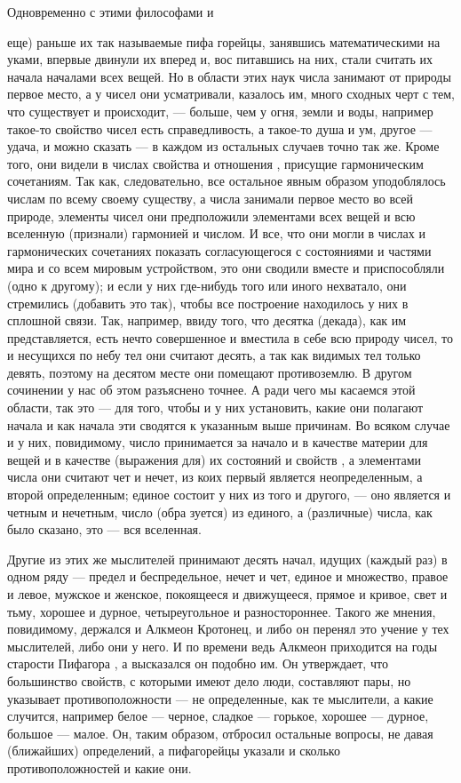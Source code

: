 \documentclass{article}
\begin{document}
Одновременно с этими философами и {еще) раньше их так называемые пифа горейцы, занявшись математическими на уками, впервые двинули их вперед и, вос питавшись на них, стали считать их начала началами всех вещей. Но в области этих наук числа занимают от природы первое место, а у чисел они усматривали, казалось им, много сходных черт с тем, что существует и происходит, --- больше, чем у огня, земли и воды, например такое-то свойство чисел есть справедливость, а такое-то душа и ум, другое --- удача, и можно сказать --- в каждом из остальных случаев точно так же. Кроме того, они видели в числах свойства и отношения , присущие гармоническим сочетаниям. Так как, следовательно, все остальное явным образом уподоблялось числам по всему своему существу, а числа занимали первое место во всей природе, элементы чисел они предположили элементами всех вещей и всю вселенную (признали) гармонией и числом. И все, что они могли в числах и гармонических сочетаниях показать согласующегося с состояниями и частями мира и со всем мировым устройством, это они сводили вместе и приспособляли (одно к другому); и если у них где-нибудь того или иного нехватало, они стремились (добавить это так), чтобы все построение находилось у них в сплошной связи. Так, например, ввиду того, что десятка (декада), как им представляется, есть нечто совершенное и вместила в себе всю природу чисел, то и несущихся по небу тел они считают десять, а так как видимых тел только девять, поэтому на десятом месте они помещают противоземлю.
\footnotemark[1]
В другом сочинении у нас об этом разъяснено точнее.
\footnotemark[2]
А ради чего мы касаемся этой области, так это --- для того, чтобы и у них установить, какие они полагают начала и как начала эти сводятся к указанным выше причинам. Во всяком случае и у них, повидимому, число принимается за начало и в качестве материи для вещей и в качестве (выражения для) их состояний и свойств , а элементами числа они считают чет и нечет, из коих первый является неопределенным, а второй определенным; единое состоит у них из того и другого, --- оно является и четным и нечетным, число (обра зуется) из единого, а (различные) числа, как было сказано, это --- вся вселенная.

Другие из этих же мыслителей принимают десять начал, идущих (каждый раз) в одном ряду --- предел и беспредельное, нечет и чет, единое и множество, правое и левое, мужское и женское, покоящееся и движущееся, прямое и кривое, свет и тьму, хорошее и дурное, четыреугольное и разностороннее.
\footnotemark[3]
Такого же мнения, повидимому, держался и Алкмеон Кротонец,
\footnotemark[4]
и либо он перенял это учение у тех мыслителей, либо они у него. И по времени ведь Алкмеон приходится на годы старости Пифагора , а высказался он подобно им. Он утверждает, что большинство свойств, с которыми имеют дело люди, составляют пары, но указывает противоположности --- не определенные, как те мыслители, а какие случится, например белое --- черное, сладкое --- горькое, хорошее --- дурное, большое --- малое. Он, таким образом, отбросил остальные вопросы, не давая (ближайших) определений, а пифагорейцы указали и сколько противоположностей и какие они.

}
\end{document}
